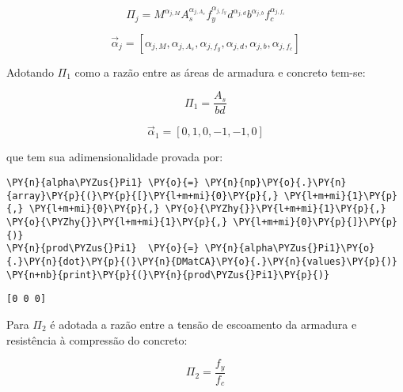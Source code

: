 \begin{equation}
\Pi_j = M^{\alpha_{j,M}} A_s^{\alpha_{j,A_s}} f_y^{\alpha_{j,f_y}} d^{\alpha_{j,d}} b^{\alpha_{j,b}} f_c^{\alpha_{j,f_c}}
\label{Pij}
\end{equation}

\begin{equation}
\vec\alpha_j = [{\alpha_{j,M}}, {\alpha_{j,A_s}}, {\alpha_{j,f_y}}, {\alpha_{j,d}}, {\alpha_{j,b}}, {\alpha_{j,f_c}}]
\label{alphaj}
\end{equation}

    Adotando \(\Pi_1\) como a razão entre as áreas de armadura e concreto
tem-se:

\begin{equation}
\Pi_1 = \frac{A_s}{bd}
\label{Pi1}
\end{equation}

\begin{equation}
\vec\alpha_1 = [0, 1, 0, -1, -1, 0]
\label{alpha1}
\end{equation}

que tem sua adimensionalidade provada por:

    \begin{tcolorbox}[breakable, size=fbox, boxrule=1pt, pad at break*=1mm,colback=cellbackground, colframe=cellborder]
\begin{Verbatim}[commandchars=\\\{\}]
\PY{n}{alpha\PYZus{}Pi1} \PY{o}{=} \PY{n}{np}\PY{o}{.}\PY{n}{array}\PY{p}{(}\PY{p}{[}\PY{l+m+mi}{0}\PY{p}{,} \PY{l+m+mi}{1}\PY{p}{,} \PY{l+m+mi}{0}\PY{p}{,} \PY{o}{\PYZhy{}}\PY{l+m+mi}{1}\PY{p}{,} \PY{o}{\PYZhy{}}\PY{l+m+mi}{1}\PY{p}{,} \PY{l+m+mi}{0}\PY{p}{]}\PY{p}{)}
\PY{n}{prod\PYZus{}Pi1}  \PY{o}{=} \PY{n}{alpha\PYZus{}Pi1}\PY{o}{.}\PY{n}{dot}\PY{p}{(}\PY{n}{DMatCA}\PY{o}{.}\PY{n}{values}\PY{p}{)}
\PY{n+nb}{print}\PY{p}{(}\PY{n}{prod\PYZus{}Pi1}\PY{p}{)}
\end{Verbatim}
\end{tcolorbox}

    \begin{Verbatim}[commandchars=\\\{\}]
[0 0 0]
    \end{Verbatim}

    Para \(\Pi_2\) é adotada a razão entre a tensão de escoamento da
armadura e resistência à compressão do concreto:

\begin{equation}
\Pi_2 = \frac{f_y}{f_c}
\label{Pi2}
\end{equation}


